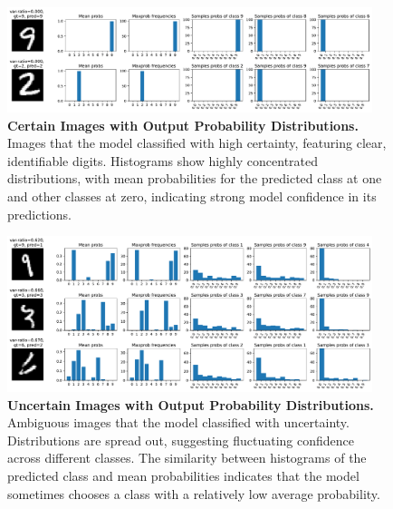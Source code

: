 \begin{figure}[H]
    \centering
    \includegraphics[width=0.95\textwidth]{var-ratio_certain_images.pdf}
    \caption{\textbf{Certain Images with Output Probability Distributions.} Images that the model classified with high certainty, featuring clear, identifiable digits. Histograms show highly concentrated distributions, with mean probabilities for the predicted class at one and other classes at zero, indicating strong model confidence in its predictions.}
    \label{fig:varratio_certain}
\end{figure}
\begin{figure}[H]
    \centering
    \includegraphics[width=0.95\textwidth]{var-ratio_uncertain_images.pdf}
    \caption{\textbf{Uncertain Images with Output Probability Distributions.} Ambiguous images that the model classified with uncertainty. Distributions are spread out, suggesting fluctuating confidence across different classes. The similarity between histograms of the predicted class and mean probabilities indicates that the model sometimes chooses a class with a relatively low average probability.}
    \label{fig:varratio_uncertain}
\end{figure}
